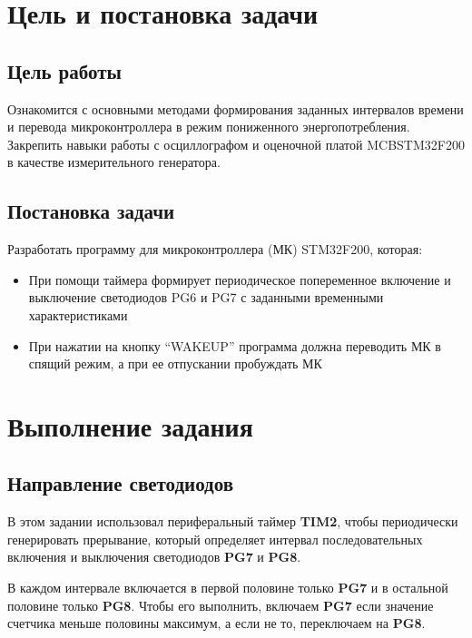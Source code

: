 \documentclass[12pt]{article} %
\begin{document}
\begin{center}

\end{center}
\doublespacing
\tableofcontents
\newpage
\section{Цель и постановка задачи}
\subsection{Цель работы}
Ознакомится с основными методами формирования заданных интервалов времени и перевода микроконтроллера в режим пониженного энергопотребления. Закрепить навыки работы с осциллографом и оценочной платой MCBSTM32F200 в качестве измерительного генератора.
\subsection{Постановка задачи}

 Разработать программу для микроконтроллера (МК) STM32F200, которая:\\

\begin{itemize}
\item При помощи таймера
формирует периодическое попеременное включение и выключение светодиодов PG6 и PG7 с заданными временными характеристиками\\
\item При нажатии на кнопку
“WAKEUP” программа должна переводить МК в спящий режим, а при ее
отпускании пробуждать МК
\end{itemize}

\section{Выполнение задания}
\subsection{Направление светодиодов}
В этом задании использовал периферальный таймер \textbf{TIM2}, чтобы периодически генерировать прерывание, который определяет интервал последовательных включения и выключения светодиодов \textbf{PG7} и \textbf{PG8}. 

В каждом интервале включается в первой половине только \textbf{PG7} и в остальной половине только \textbf{PG8}. Чтобы его выполнить, включаем \textbf{PG7} если значение счетчика меньше половины максимум, а если не то, переключаем на \textbf{PG8}. 
\inputminted[firstline = 86, lastline = 95, breaklines]{C}{F:/git/micro/Lab4/Lab4.c}
\end{document}
